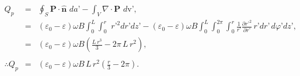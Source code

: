 \documentclass[11pt,fleqn]{book} %
\begin{document}
\begin{example}
\begin{eqnarray}
Q_p&=&\oint_S\textbf{P}\cdot\hat{\textbf{n}}\,\,da\textbf{'}-\int_V\nabla\cdot\textbf{P}\,\,d\mbox{v}\textbf{'},\nonumber\\
&=&(\varepsilon_0-\varepsilon)\omega B\int_{0}^{L}\int_{0}^{r}\,\,r\textbf{'}^2dr\textbf{'}dz\textbf{'}-(\varepsilon_0-\varepsilon)\omega B\int_{0}^{L}\int_{0}^{2\pi}\int_{0}^{r}\frac{1}{r\textbf{'}}\frac{\partial r\textbf{'}^2}{\partial r\textbf{'}}\,r\textbf{'}dr\textbf{'}\,d\varphi\textbf{'}dz\textbf{'},\nonumber\\
&=&(\varepsilon_0-\varepsilon)\omega B\left(\frac{L\,r^3}{3}-2\pi \,L\,r^2 \right), \nonumber\\
\nonumber\\
\therefore Q_p&=&(\varepsilon_0-\varepsilon)\omega B\,L\,r^2\left(\frac{r}{3}-2\pi\right).
\end{eqnarray}
\end{example}




\end{document}
